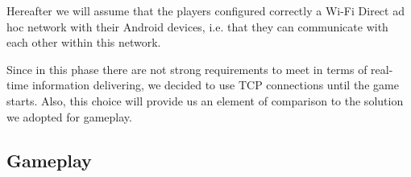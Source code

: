 Hereafter we will assume that the players configured correctly a Wi-Fi Direct
ad hoc network with their Android devices, i.e. that they can communicate with
each other within this network.

Since in this phase there are not strong requirements to meet in terms of
real-time information delivering, we decided to use TCP connections until the
game starts. Also, this choice will provide us an element of comparison to the
solution we adopted for gameplay.


\subsection{Gameplay}

